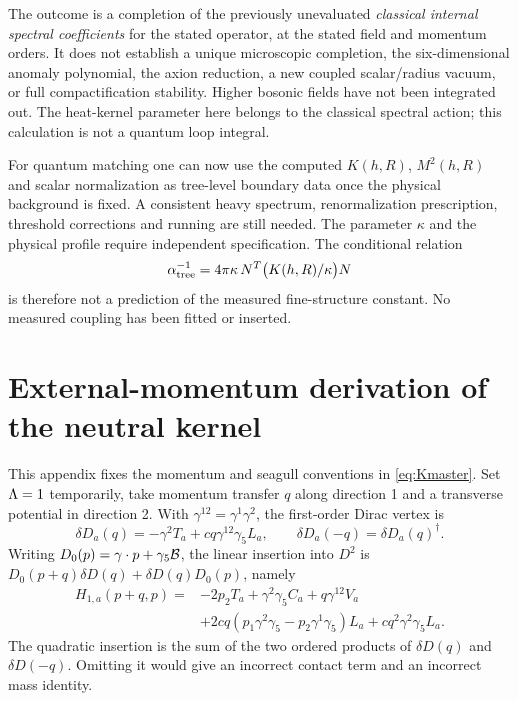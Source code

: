 \documentclass[11pt,letterpaper]{article}
\begin{document}
The outcome is a completion of the previously unevaluated \emph{classical internal spectral coefficients} for the stated operator, at the stated field and momentum orders. It does not establish a unique microscopic completion, the six-dimensional anomaly polynomial, the axion reduction, a new coupled scalar/radius vacuum, or full compactification stability. Higher bosonic fields have not been integrated out. The heat-kernel parameter here belongs to the classical spectral action; this calculation is not a quantum loop integral.

For quantum matching one can now use the computed $K(h,R)$, $M^2(h,R)$ and scalar normalization as tree-level boundary data once the physical background is fixed. A consistent heavy spectrum, renormalization prescription, threshold corrections and running are still needed. The parameter $\kappa$ and the physical profile require independent specification. The conditional relation
\begin{equation}
 \alpha^{-1}_{\rm tree}=4\pi\kappa\,N^T\bigl(K(h,R)/\kappa\bigr)N
\end{equation}
is therefore not a prediction of the measured fine-structure constant. No measured coupling has been fitted or inserted.

\appendix
\section{External-momentum derivation of the neutral kernel}

This appendix fixes the momentum and seagull conventions in \eqref{eq:Kmaster}. Set $\Lambda=1$ temporarily, take momentum transfer $q$ along direction 1 and a transverse potential in direction 2. With $\gamma^{12}=\gamma^1\gamma^2$, the first-order Dirac vertex is
\begin{equation}
 \delta D_a(q)=-\gamma^2T_a+cq\gamma^{12}\gamma_5L_a,
 \qquad \delta D_a(-q)=\delta D_a(q)^\dagger.
\end{equation}
Writing $D_0(p)=\gamma\cdot p+\gamma_5\mathcal B$, the linear insertion into $D^2$ is $D_0(p+q)\delta D(q)+\delta D(q)D_0(p)$, namely
\begin{align}
 H_{1,a}(p+q,p)={}&-2p_2T_a+\gamma^2\gamma_5C_a
       +q\gamma^{12}V_a\nonumber\\
 &+2cq(p_1\gamma^2\gamma_5-p_2\gamma^1\gamma_5)L_a
       +cq^2\gamma^2\gamma_5L_a.\label{eq:H1}
\end{align}
The quadratic insertion is the sum of the two ordered products of $\delta D(q)$ and $\delta D(-q)$. Omitting it would give an incorrect contact term and an incorrect mass identity.
\end{document}
